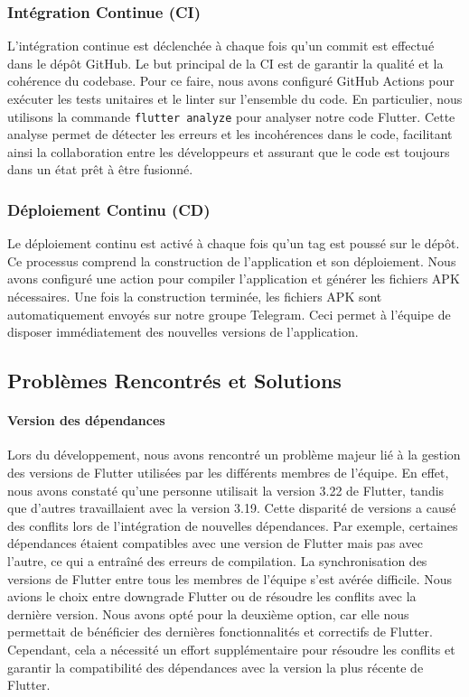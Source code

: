 \subsubsection{Intégration Continue (CI)}

L'intégration continue est déclenchée à chaque fois qu'un commit est effectué dans le dépôt GitHub. Le but principal de la CI est de garantir la qualité et la cohérence du codebase. Pour ce faire, nous avons configuré GitHub Actions pour exécuter les tests unitaires et le linter sur l'ensemble du code. En particulier, nous utilisons la commande \texttt{flutter analyze} pour analyser notre code Flutter. Cette analyse permet de détecter les erreurs et les incohérences dans le code, facilitant ainsi la collaboration entre les développeurs et assurant que le code est toujours dans un état prêt à être fusionné.

\subsubsection{Déploiement Continu (CD)}

Le déploiement continu est activé à chaque fois qu'un tag est poussé sur le dépôt. Ce processus comprend la construction de l'application et son déploiement. Nous avons configuré une action pour compiler l'application et générer les fichiers APK nécessaires. Une fois la construction terminée, les fichiers APK sont automatiquement envoyés sur notre groupe Telegram. Ceci permet à l'équipe de disposer immédiatement des nouvelles versions de l'application.

\subsection{Problèmes Rencontrés et Solutions}
\label{sec:problems}

\paragraph{Version des dépendances} Lors du développement, nous avons rencontré un problème majeur lié à la gestion des versions de Flutter utilisées par les différents membres de l'équipe. En effet, nous avons constaté qu'une personne utilisait la version 3.22 de Flutter, tandis que d'autres travaillaient avec la version 3.19. Cette disparité de versions a causé des conflits lors de l'intégration de nouvelles dépendances. Par exemple, certaines dépendances étaient compatibles avec une version de Flutter mais pas avec l'autre, ce qui a entraîné des erreurs de compilation. La synchronisation des versions de Flutter entre tous les membres de l'équipe s'est avérée difficile. Nous avions le choix entre downgrade Flutter ou de résoudre les conflits avec la dernière version. Nous avons opté pour la deuxième option, car elle nous permettait de bénéficier des dernières fonctionnalités et correctifs de Flutter. Cependant, cela a nécessité un effort supplémentaire pour résoudre les conflits et garantir la compatibilité des dépendances avec la version la plus récente de Flutter.

